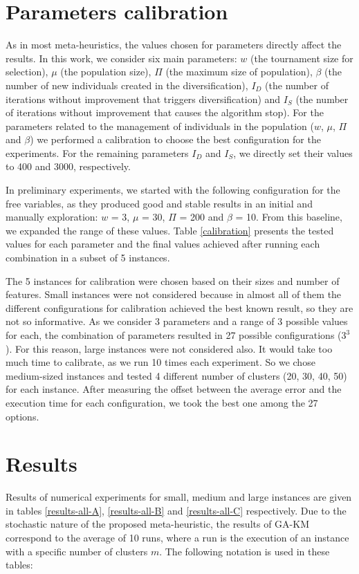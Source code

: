 \section{Parameters calibration}
\label{sec:calibration}
As in most meta-heuristics, the values chosen for parameters directly affect the results. In this work, we consider six main parameters: $w$ (the tournament size for selection), $\mu$ (the population size), $\Pi$ (the maximum size of population), $\beta$ (the number of new individuals created in the diversification), $I_D$ (the number of iterations without improvement that triggers diversification) and $I_S$ (the number of iterations without improvement that causes the algorithm stop). For the parameters related to the management of individuals in the population ($w$, $\mu$, $\Pi$ and $\beta$) we performed a calibration to choose the best configuration for the experiments. For the remaining parameters $I_D$ and $I_S$, we directly set their values to 400 and 3000, respectively.

In preliminary experiments, we started with the following configuration for the free variables, as they produced good and stable results in an initial and manually exploration: $w$ = 3, $\mu$ = 30, $\Pi$ = 200 and $\beta$ = 10. From this baseline, we expanded the range of these values. Table \ref{calibration} presents the tested values for each parameter and the final values achieved after running each combination in a subset of 5 instances.

The 5 instances for calibration were chosen based on their sizes and number of features. Small instances were not considered because in almost all of them the different configurations for calibration achieved the best known result, so they are not so informative. As we consider 3 parameters and a range of 3 possible values for each, the combination of parameters resulted in 27 possible configurations ($3^3$). For this reason, large instances were not considered also. It would take too much time to calibrate, as we run 10 times each experiment. So we chose medium-sized instances and tested 4 different number of clusters (20, 30, 40, 50) for each instance. After measuring the offset between the average error and the execution time for each configuration, we took the best one among the 27 options.



\section{Results}
\label{sec:results}
Results of numerical experiments for small, medium and large instances are given in tables \ref{results-all-A}, \ref{results-all-B} and \ref{results-all-C} respectively. Due to the stochastic nature of the proposed meta-heuristic, the results of GA-KM correspond to the average of 10 runs, where a run is the execution of an instance with a specific number of clusters $m$. The following notation is used in these tables:

